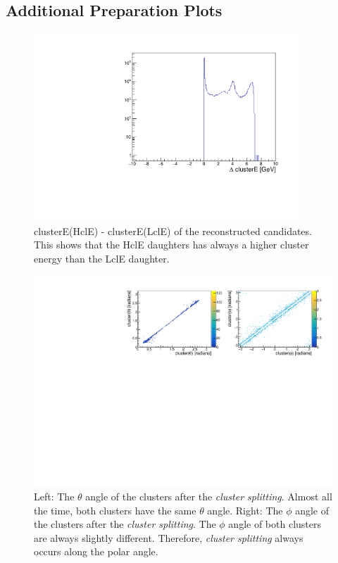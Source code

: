 \documentclass[a4paper,11pt,twosided,final,german,openbib,pdftex,listof=totoc,bibliography=totoc]{scrbook}
\begin{document}
\begin{appendix}
	

	
	
\chapter{Additional Preparation Plots}


\begin{figure}[h!]
	\centering
	\includegraphics[width=10cm]{AnhangPlots/clEDiff.pdf}
	\caption[clusterE(HclE) - clusterE(LclE)]{clusterE(HclE) - clusterE(LclE) of the reconstructed candidates. This shows that the HclE daughters has always a higher cluster energy than the LclE daughter.}
	\label{fig:clEDiff}
\end{figure}



\begin{figure}[h!]
	\centering
	\includegraphics[width=\textwidth]{AnhangPlots/ttpp.pdf}
	\caption[Cluster Splitting Angle Distribution]{Left: The $\theta$ angle of the clusters after the \textit{cluster splitting}. Almost all the time, both clusters have the same $\theta$ angle.  Right: The $\phi$ angle of the clusters after the \textit{cluster splitting}. The $\phi$ angle of both clusters are always slightly different. Therefore, \textit{cluster splitting} always occurs along the polar angle.}
	\label{fig:clusterSplittingAngle}
\end{figure}




\end{appendix}
\end{document}
